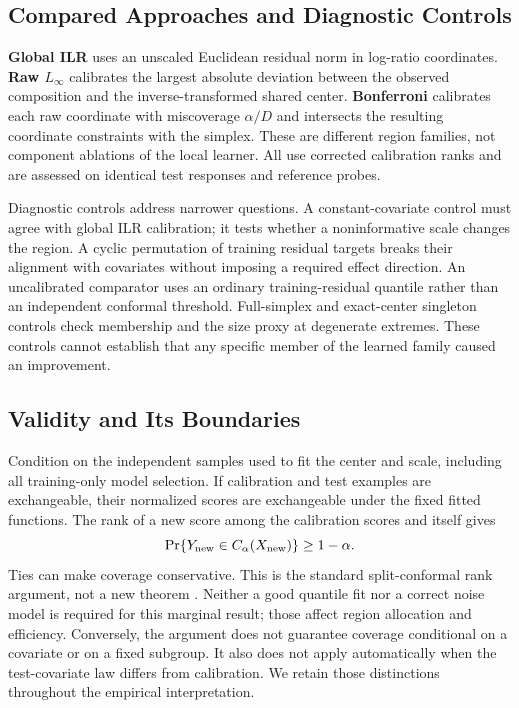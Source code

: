 \documentclass{article}
\begin{document}
\subsection{Compared Approaches and Diagnostic Controls}
\textbf{Global ILR} uses an unscaled Euclidean residual norm in log-ratio coordinates. \textbf{Raw $L_\infty$} calibrates the largest absolute deviation between the observed composition and the inverse-transformed shared center. \textbf{Bonferroni} calibrates each raw coordinate with miscoverage $\alpha/D$ and intersects the resulting coordinate constraints with the simplex. These are different region families, not component ablations of the local learner. All use corrected calibration ranks and are assessed on identical test responses and reference probes.

Diagnostic controls address narrower questions. A constant-covariate control must agree with global ILR calibration; it tests whether a noninformative scale changes the region. A cyclic permutation of training residual targets breaks their alignment with covariates without imposing a required effect direction. An uncalibrated comparator uses an ordinary training-residual quantile rather than an independent conformal threshold. Full-simplex and exact-center singleton controls check membership and the size proxy at degenerate extremes. These controls cannot establish that any specific member of the learned family caused an improvement.

\subsection{Validity and Its Boundaries}
Condition on the independent samples used to fit the center and scale, including all training-only model selection. If calibration and test examples are exchangeable, their normalized scores are exchangeable under the fixed fitted functions. The rank of a new score among the calibration scores and itself gives
\begin{equation}
 \Pr\{Y_{\rm new}\in C_\alpha(X_{\rm new})\}\ge 1-\alpha.
\end{equation}
Ties can make coverage conservative. This is the standard split-conformal rank argument, not a new theorem \citep{Vovk2005,Lei2018}. Neither a good quantile fit nor a correct noise model is required for this marginal result; those affect region allocation and efficiency. Conversely, the argument does not guarantee coverage conditional on a covariate or on a fixed subgroup. It also does not apply automatically when the test-covariate law differs from calibration. We retain those distinctions throughout the empirical interpretation.
\end{document}
